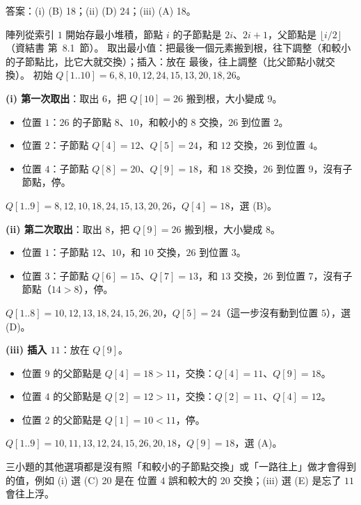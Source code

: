 \begin{pastsoln}
答案：(i) (B) 18；(ii) (D) 24；(iii) (A) 18。

陣列從索引 $1$ 開始存最小堆積，節點 $i$ 的子節點是 $2i$、$2i + 1$，父節點是 $\lfloor i/2 \rfloor$（資結書
第~8.1~節）。 取出最小值：把最後一個元素搬到根，往下調整（和較小的子節點比，比它大就交換）；插入：放在
最後，往上調整（比父節點小就交換）。 初始 $Q[1..10] = 6, 8, 10, 12, 24, 15, 13, 20, 18, 26$。

\textbf{(i) 第一次取出}：取出 $6$，把 $Q[10] = 26$ 搬到根，大小變成 $9$。
\begin{itemize}
\item 位置 $1$：$26$ 的子節點 $8$、$10$，和較小的 $8$ 交換，$26$ 到位置 $2$。
\item 位置 $2$：子節點 $Q[4] = 12$、$Q[5] = 24$，和 $12$ 交換，$26$ 到位置 $4$。
\item 位置 $4$：子節點 $Q[8] = 20$、$Q[9] = 18$，和 $18$ 交換，$26$ 到位置 $9$，沒有子節點，停。
\end{itemize}
$Q[1..9] = 8, 12, 10, 18, 24, 15, 13, 20, 26$，$Q[4] = 18$，選 (B)。

\textbf{(ii) 第二次取出}：取出 $8$，把 $Q[9] = 26$ 搬到根，大小變成 $8$。
\begin{itemize}
\item 位置 $1$：子節點 $12$、$10$，和 $10$ 交換，$26$ 到位置 $3$。
\item 位置 $3$：子節點 $Q[6] = 15$、$Q[7] = 13$，和 $13$ 交換，$26$ 到位置 $7$，沒有子節點（$14 > 8$），停。
\end{itemize}
$Q[1..8] = 10, 12, 13, 18, 24, 15, 26, 20$，$Q[5] = 24$（這一步沒有動到位置 $5$），選 (D)。

\textbf{(iii) 插入 $11$}：放在 $Q[9]$。
\begin{itemize}
\item 位置 $9$ 的父節點是 $Q[4] = 18 > 11$，交換：$Q[4] = 11$、$Q[9] = 18$。
\item 位置 $4$ 的父節點是 $Q[2] = 12 > 11$，交換：$Q[2] = 11$、$Q[4] = 12$。
\item 位置 $2$ 的父節點是 $Q[1] = 10 < 11$，停。
\end{itemize}
$Q[1..9] = 10, 11, 13, 12, 24, 15, 26, 20, 18$，$Q[9] = 18$，選 (A)。

三小題的其他選項都是沒有照「和較小的子節點交換」或「一路往上」做才會得到的值，例如 (i) 選 (C) 20 是在
位置 $4$ 誤和較大的 $20$ 交換；(iii) 選 (E) 是忘了 $11$ 會往上浮。
\end{pastsoln}
